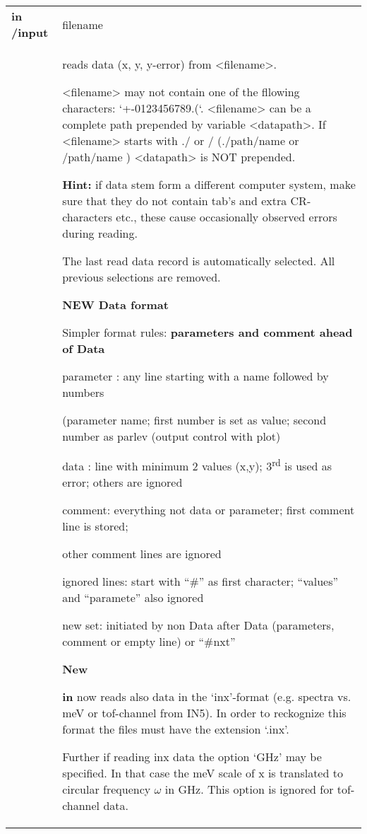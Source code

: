 \documentclass[]{article}
\begin{document}
\begin{longtable}[]{@{}ll@{}}
\toprule
\endhead
\textbf{in /input} & filename\tabularnewline
\begin{minipage}[t]{0.47\columnwidth}\raggedright
\strut
\end{minipage} & \begin{minipage}[t]{0.47\columnwidth}\raggedright
reads data (x, y, y-error) from \textless{}filename\textgreater{}.

\textless{}filename\textgreater{} may not contain one of the fllowing
characters: `+-0123456789.(`. \textless{}filename\textgreater{} can be a
complete path prepended by variable \textless{}datapath\textgreater{}.
If \textless{}filename\textgreater{} starts with ./ or / (./path/name or
/path/name ) \textless{}datapath\textgreater{} is NOT prepended.

\textbf{Hint:} if data stem form a different computer system, make sure
that they do not contain tab's and extra CR-characters etc., these cause
occasionally observed errors during reading.

The last read data record is automatically selected. All previous
selections are removed.

\textbf{NEW Data format}

Simpler format rules: \textbf{parameters and comment ahead of Data }

parameter : any line starting with a name followed by numbers

(parameter name; first number is set as value; second number as parlev
(output control with plot)

data : line with minimum 2 values (x,y); 3\textsuperscript{rd} is used
as error; others are ignored

comment: everything not data or parameter; first comment line is stored;

other comment lines are ignored

ignored lines: start with ``\#'' as first character; ``values'' and
``paramete'' also ignored

new set: initiated by non Data after Data (parameters, comment or empty
line) or ``\#nxt''

\textbf{New }

\textbf{in} now reads also data in the `inx'-format (e.g. spectra vs.
meV or tof-channel from IN5). In order to reckognize this format the
files must have the extension `.inx'.

Further if reading inx data the option `GHz' may be specified. In that
case the meV scale of x is translated to circular frequency ${\omega}$ in GHz.
This option is ignored for tof-channel data.


\end{minipage}
\end{longtable}
\end{document}
